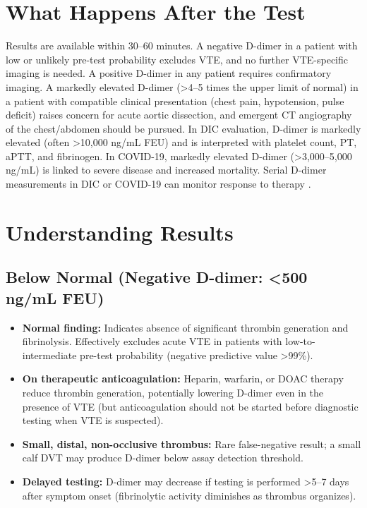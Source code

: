 \section*{What Happens After the Test}
Results are available within 30--60 minutes. A negative D-dimer in a patient with low or unlikely pre-test probability excludes VTE, and no further VTE-specific imaging is needed. A positive D-dimer in any patient requires confirmatory imaging. A markedly elevated D-dimer (>4--5 times the upper limit of normal) in a patient with compatible clinical presentation (chest pain, hypotension, pulse deficit) raises concern for acute aortic dissection, and emergent CT angiography of the chest/abdomen should be pursued. In DIC evaluation, D-dimer is markedly elevated (often >10,000 ng/mL FEU) and is interpreted with platelet count, PT, aPTT, and fibrinogen. In COVID-19, markedly elevated D-dimer (>3,000--5,000 ng/mL) is linked to severe disease and increased mortality. Serial D-dimer measurements in DIC or COVID-19 can monitor response to therapy \cite{tierney2023current}.

\section*{Understanding Results}

\subsection*{Below Normal (Negative D-dimer: <500 ng/mL FEU)}
\begin{itemize}
  \item \textbf{Normal finding:} Indicates absence of significant thrombin generation and fibrinolysis. Effectively excludes acute VTE in patients with low-to-intermediate pre-test probability (negative predictive value >99\%).
  \item \textbf{On therapeutic anticoagulation:} Heparin, warfarin, or DOAC therapy reduce thrombin generation, potentially lowering D-dimer even in the presence of VTE (but anticoagulation should not be started before diagnostic testing when VTE is suspected).
  \item \textbf{Small, distal, non-occlusive thrombus:} Rare false-negative result; a small calf DVT may produce D-dimer below assay detection threshold.
  \item \textbf{Delayed testing:} D-dimer may decrease if testing is performed >5--7 days after symptom onset (fibrinolytic activity diminishes as thrombus organizes).
\end{itemize}

